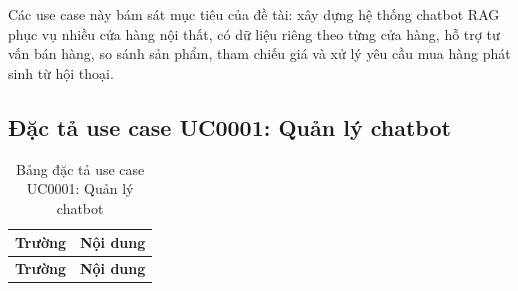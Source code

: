 \documentclass[../DoAn.tex]{subfiles}
\begin{document}
Các use case này bám sát mục tiêu của đề tài: xây dựng hệ thống chatbot RAG phục vụ nhiều cửa hàng nội thất, có dữ liệu riêng theo từng cửa hàng, hỗ trợ tư vấn bán hàng, so sánh sản phẩm, tham chiếu giá và xử lý yêu cầu mua hàng phát sinh từ hội thoại.

\subsection{Đặc tả use case UC0001: Quản lý chatbot}
\label{subsection:2.3.1}

\begin{longtable}{|p{}|p{}|}
\caption{Bảng đặc tả use case UC0001: Quản lý chatbot}
\label{table:uc0001} \\
\hline
\textbf{Trường} & \textbf{Nội dung} \\
\hline
\endfirsthead

\hline
\textbf{Trường} & \textbf{Nội dung} \\
\hline
\endhead


\end{longtable}
\end{document}
